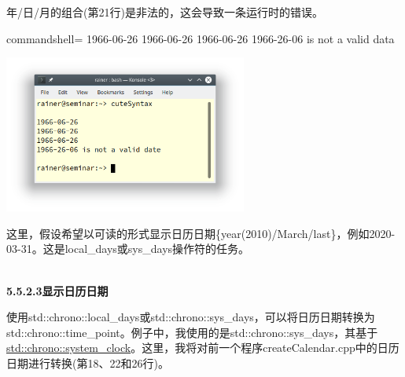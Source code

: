 年/日/月的组合(第21行)是非法的，这会导致一条运行时的错误。

\begin{tcblisting}{commandshell={}}
1966-06-26
1966-06-26
1966-06-26
1966-26-06 is not a valid data
\end{tcblisting}

\begin{center}
\includegraphics[width=0.6\textwidth]{content/3/chapter5/images/21.png}\\
\end{center}

这里，假设希望以可读的形式显示日历日期\{year(2010)/March/last\}，例如2020-03-31。这是local\_days或sys\_days操作符的任务。

\hspace*{\fill} \\ %
\noindent
\textbf{5.5.2.3\hspace{0.2cm}显示日历日期}

使用std::chrono::local\_days或std::chrono::sys\_days，可以将日历日期转换为std::chrono::time\_point。例子中，我使用的是std::chrono::sys\_days，其基于\href{https://en.cppreference.com/w/cpp/chrono/system_clock}{std::chrono::system\_clock}。这里，我将对前一个程序createCalendar.cpp中的日历日期进行转换(第18、22和26行)。

